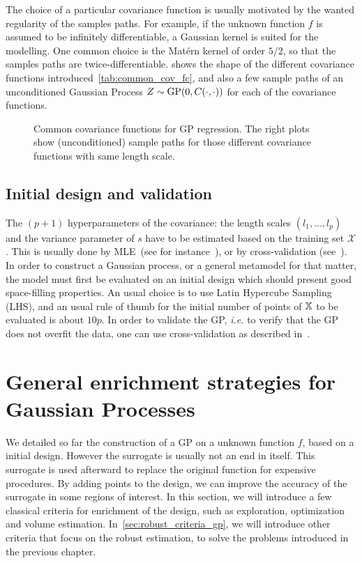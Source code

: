 \documentclass[../../Main_ManuscritThese.tex]{subfiles}
\newcommand\imgpath{/home/victor/acadwriting/Manuscrit/Text/Chapter4/img/}
\begin{document}
  The choice of a particular covariance function is usually motivated
  by the wanted regularity of the samples paths. For example, if the
  unknown function $f$ is assumed to be infinitely differentiable, a
  Gaussian kernel is suited for the modelling. One common choice is
  the Matérn kernel of order $5/2$, so that the samples paths are
  twice-differentiable.  shows the shape of
  the different covariance functions
  introduced~\cref{tab:common_cov_fc}, and also a few sample paths of
  an unconditioned Gaussian Process $Z\sim\operatorname{\mathrm{GP}}(0, C(\cdot, \cdot))$ for
  each of the covariance functions.
  
\begin{figure}[ht]
  \centering
  
  \caption[Common covariance functions for GP]{\label{fig:cov_fc_examples} Common covariance functions for GP regression. The right plots show (unconditioned) sample paths for those different covariance functions with same length scale.}
\end{figure}

\subsection{Initial design and validation}

The $(p + 1)$ hyperparameters of the covariance: the length scales $(l_1,\dots,l_{p})$ and the variance parameter of $s$ have to be estimated based on the training set $\mathcal{X}$. This is usually done by MLE~(see for instance~\cite{ribaud_robustness_2019}), or by cross-validation (see~\cite{ginsbourger_note_2009}).
In order to construct a Gaussian process, or a general metamodel for that matter, the model must first be evaluated on an initial design which should present good space-filling properties. An usual choice is to use Latin Hypercube Sampling (LHS), and an usual rule of thumb for the initial number of points of $\mathbb{X}$ to be evaluated is about $10p$. In order to validate the GP, \emph{i.e.} to verify that the GP does not overfit the data, one can use cross-validation as described in~\cite{dubrule_cross_1983}.


\section{General enrichment strategies for Gaussian Processes}
\label{sec:enrichment_strategies}
We detailed so far the construction of a GP on a unknown function $f$, based on a initial design. However the surrogate is usually not an end in itself. This surrogate is used afterward to replace the original function for expensive procedures.
By adding points to the design, we can improve the accuracy of the surrogate in some regions of interest. In this section, we will introduce a few classical criteria for enrichment of the design, such as exploration, optimization and volume estimation.
In~\cref{sec:robust_criteria_gp}, we will introduce other criteria that focus on the robust estimation, to solve the problems introduced in the previous chapter.
\end{document}
